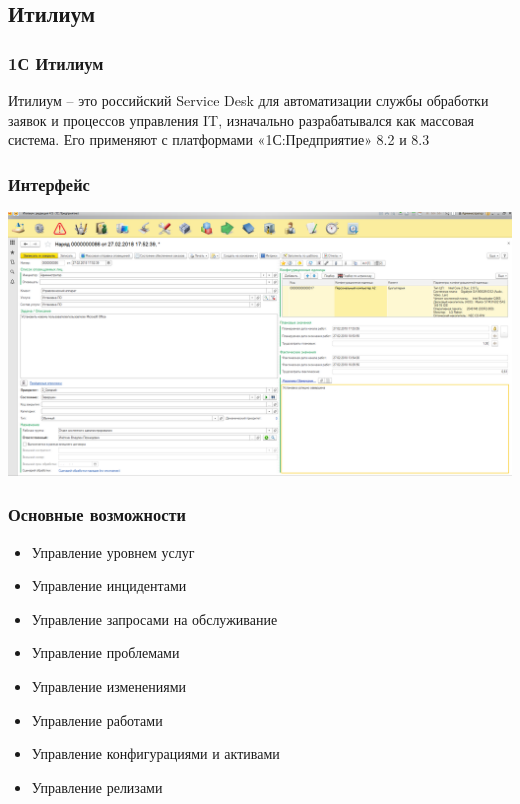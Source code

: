 \documentclass{../industrial-development}
\begin{document}
\subsection{Итилиум}
\begin{frame} \frametitle{1С Итилиум}

    Итилиум -- это российский Service Desk для автоматизации службы обработки заявок и процессов управления IT, изначально разрабатывался как массовая система. Его применяют с платформами «1С:Предприятие» 8.2 и 8.3

\end{frame}
\lecturenotes

\begin{frame} \frametitle{Интерфейс}
\centerline{\includegraphics[width=\textwidth]{pic10.png}}
\end{frame}
\lecturenotes


\begin{frame} \frametitle{Основные возможности}
	\begin{itemize}
    \item Управление уровнем услуг
    \item Управление инцидентами
    \item Управление запросами на обслуживание
    \item Управление проблемами
    \item Управление изменениями
    \item Управление работами
    \item Управление конфигурациями и активами
    \item Управление релизами
	\end{itemize}
\end{frame}
\lecturenotes
\end{document}
